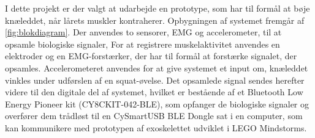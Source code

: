 I dette projekt er der valgt at udarbejde en prototype, som har til formål at bøje knæleddet, når lårets muskler kontraherer. Opbygningen af systemet fremgår af \autoref{fig:blokdiagram}. Der anvendes to sensorer, EMG og accelerometer, til at opsamle biologiske signaler, For at registrere muskelaktivitet anvendes en elektroder og en EMG-forstærker, der har til formål at forstærke signalet, der opsamles. Accelerometeret anvendes for at give systemet et input om, knæleddet vinkles  under udførslen af en squat-øvelse. Det opsamlede signal sendes herefter videre til den digitale del af systemet, hvilket er bestående af et Bluetooth Low Energy Pioneer kit (CY8CKIT-042-BLE), som opfanger de biologiske signaler og overfører dem trådløst til en CySmartUSB BLE Dongle sat i en computer, som kan kommunikere med prototypen af exoskelettet udviklet i LEGO Mindstorms. 


